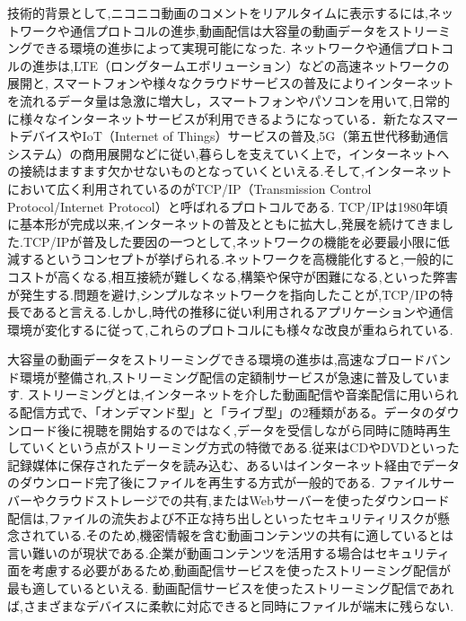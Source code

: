 技術的背景として,ニコニコ動画のコメントをリアルタイムに表示するには,ネットワークや通信プロトコルの進歩,動画配信は大容量の動画データをストリーミングできる環境の進歩によって実現可能になった.
ネットワークや通信プロトコルの進歩は,LTE（ロングタームエボリューション）などの高速ネットワークの展開と, スマートフォンや様々なクラウドサービスの普及によりインターネットを流れるデータ量は急激に増大し，スマートフォンやパソコンを用いて,日常的に様々なインターネットサービスが利用できるようになっている．新たなスマートデバイスやIoT（Internet of Things）サービスの普及,5G（第五世代移動通信システム）の商用展開などに従い,暮らしを支えていく上で，インターネットへの接続はますます欠かせないものとなっていくといえる.そして,インターネットにおいて広く利用されているのがTCP/IP（Transmission Control Protocol/Internet Protocol）と呼ばれるプロトコルである.
TCP/IPは1980年頃に基本形が完成以来,インターネットの普及とともに拡大し,発展を続けてきました.TCP/IPが普及した要因の一つとして,ネットワークの機能を必要最小限に低減するというコンセプトが挙げられる.ネットワークを高機能化すると,一般的にコストが高くなる,相互接続が難しくなる,構築や保守が困難になる,といった弊害が発生する.問題を避け,シンプルなネットワークを指向したことが,TCP/IPの特長であると言える.しかし,時代の推移に従い利用されるアプリケーションや通信環境が変化するに従って,これらのプロトコルにも様々な改良が重ねられている.

大容量の動画データをストリーミングできる環境の進歩は,高速なブロードバンド環境が整備され,ストリーミング配信の定額制サービスが急速に普及しています.
ストリーミングとは,インターネットを介した動画配信や音楽配信に用いられる配信方式で、「オンデマンド型」と「ライブ型」の2種類がある。データのダウンロード後に視聴を開始するのではなく,データを受信しながら同時に随時再生していくという点がストリーミング方式の特徴である.従来はCDやDVDといった記録媒体に保存されたデータを読み込む、あるいはインターネット経由でデータのダウンロード完了後にファイルを再生する方式が一般的である.
ファイルサーバーやクラウドストレージでの共有,またはWebサーバーを使ったダウンロード配信は,ファイルの流失および不正な持ち出しといったセキュリティリスクが懸念されている.そのため,機密情報を含む動画コンテンツの共有に適しているとは言い難いのが現状である.企業が動画コンテンツを活用する場合はセキュリティ面を考慮する必要があるため,動画配信サービスを使ったストリーミング配信が最も適しているといえる.
動画配信サービスを使ったストリーミング配信であれば,さまざまなデバイスに柔軟に対応できると同時にファイルが端末に残らない.

